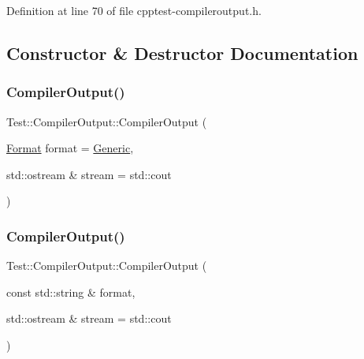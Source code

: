 Definition at line 70 of file cpptest-\/compileroutput.\+h.



\subsection{Constructor \& Destructor Documentation}
\mbox{\label{class_test_1_1_compiler_output_a816ae9a0ff2fb6cbb95c7cd815a6e621}} 
\subsubsection{\texorpdfstring{Compiler\+Output()}{CompilerOutput()}\hspace{0.1cm}{\footnotesize\ttfamily [1/2]}}
{\footnotesize\ttfamily Test\+::\+Compiler\+Output\+::\+Compiler\+Output (\begin{DoxyParamCaption}\item[{\mbox{\hyperlink{class_test_1_1_compiler_output_ab34cf506804cefbc67545a256af196ff}{Format}}}]{format = {\ttfamily \mbox{\hyperlink{class_test_1_1_compiler_output_ab34cf506804cefbc67545a256af196ffa1a83926858dfb1bab06bc0a313a49dac}{Generic}}},  }\item[{std\+::ostream \&}]{stream = {\ttfamily std\+:\+:cout} }\end{DoxyParamCaption})\hspace{0.3cm}{\ttfamily [explicit]}}

\mbox{\label{class_test_1_1_compiler_output_a49f7092d23ce60e3b83fa30fb5ab9ab7}} 
\subsubsection{\texorpdfstring{Compiler\+Output()}{CompilerOutput()}\hspace{0.1cm}{\footnotesize\ttfamily [2/2]}}
{\footnotesize\ttfamily Test\+::\+Compiler\+Output\+::\+Compiler\+Output (\begin{DoxyParamCaption}\item[{const std\+::string \&}]{format,  }\item[{std\+::ostream \&}]{stream = {\ttfamily std\+:\+:cout} }\end{DoxyParamCaption})\hspace{0.3cm}{\ttfamily [explicit]}}



